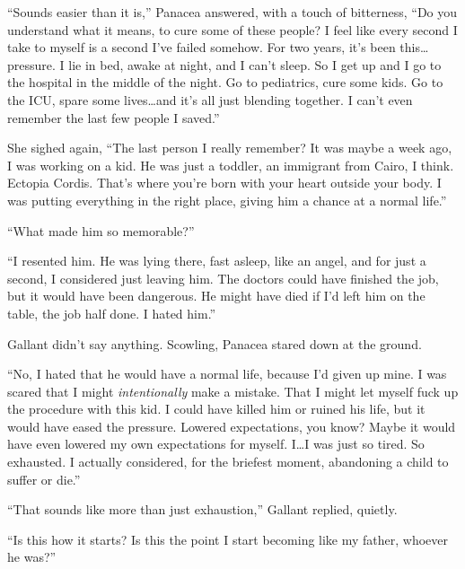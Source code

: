 ``Sounds easier than it is,'' Panacea answered, with a touch of bitterness, ``Do you understand what it means, to cure some of these people?  I feel like every second I take to myself is a second I've failed somehow.  For two years, it's been this\ldots pressure.  I lie in bed, awake at night, and I can't sleep.  So I get up and I go to the hospital in the middle of the night.  Go to pediatrics, cure some kids.  Go to the ICU, spare some lives\ldots and it's all just blending together.  I can't even remember the last few people I saved.''



She sighed again, ``The last person I really remember?  It was maybe a week ago, I was working on a kid.  He was just a toddler, an immigrant from Cairo, I think.  Ectopia Cordis.  That's where you're born with your heart outside your body.  I was putting everything in the right place, giving him a chance at a normal life.''



``What made him so memorable?''



``I resented him.  He was lying there, fast asleep, like an angel, and for just a second, I considered just leaving him.  The doctors could have finished the job, but it would have been dangerous.  He might have died if I'd left him on the table, the job half done.  I hated him.''



Gallant didn't say anything.  Scowling, Panacea stared down at the ground.



``No, I hated that he would have a normal life, because I'd given up mine.  I was scared that I might \emph{intentionally} make a mistake.  That I might let myself fuck up the procedure with this kid.  I could have killed him or ruined his life, but it would have eased the pressure.  Lowered expectations, you know?  Maybe it would have even lowered my own expectations for myself.  I\ldots I was just so tired.  So exhausted.  I actually considered, for the briefest moment, abandoning a child to suffer or die.''



``That sounds like more than just exhaustion,'' Gallant replied, quietly.



``Is this how it starts?  Is this the point I start becoming like my father, whoever he was?''



